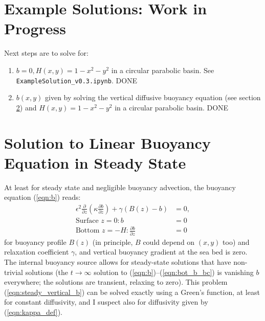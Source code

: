 \documentclass[10pt]{amsart}
\begin{document}
\section{Example Solutions: Work in Progress}


Next steps are to solve for:
\begin{enumerate}
\item $b=0, H(x,y) = 1 - x^2 - y^2$ in a circular parabolic basin. See \texttt{ExampleSolution\_v0.3.ipynb}.  DONE
\item $b(x,y)$ given by solving the vertical diffusive buoyancy equation (see section \ref{sec:b_solution}) and $H(x,y) = 1 - x^2 - y^2$ in a circular parabolic basin. DONE
\end{enumerate}

\section{Solution to Linear Buoyancy Equation in Steady State}
\label{sec:b_solution}

At least for steady state and negligible buoyancy advection, the buoyancy equation (\ref{eqn:b}) reads:
\begin{align}
\epsilon^2 \frac{\partial }{\partial z} \left( \kappa \frac{\partial b}{\partial z} \right) + \gamma \left(  B(z) - b \right) & = 0, \label{eqn:steady_vertical_b} \\
\text{Surface~}z = 0:
b &= 0
 \\
\text{Bottom~}z = -H:
\frac{\partial b}{\partial z} &= 0
\end{align}
for buoyancy profile $B(z)$ (in principle, $B$ could depend on $(x,y)$ too) and relaxation coefficient $\gamma$, and vertical buoyancy gradient at the sea bed is zero. 
The internal buoyancy source allows for steady-state solutions that have non-trivial solutions (the $t\rightarrow \infty$ solution to (\ref{eqn:b})--(\ref{eqn:bot_b_bc}) is vanishing $b$ everywhere; the \citealt{peterson&callies26} solutions are transient, relaxing to zero).
This problem (\ref{eqn:steady_vertical_b}) can be solved exactly using a Green's function, at least for constant diffusivity, and I suspect also for diffusivity given by (\ref{eqn:kappa_def}). 
\end{document}
